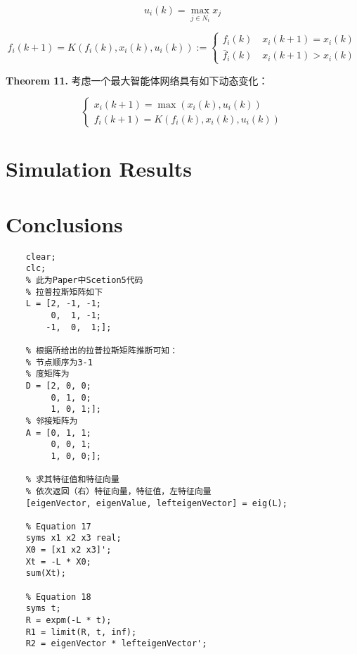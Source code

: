 \documentclass{article}
\begin{document}
\begin{equation}
    \tag{A4}
    \label{A4}
    u_i(k) = \max_{j\in N_i}x_j
\end{equation}

\begin{equation}
    \tag{43}
    \label{43}
    f_i(k+1) = K(f_i(k),x_i(k),u_i(k)):=
    \left\{
        \begin{matrix}
            f_i(k)\quad x_i(k+1)=x_i(k)\\
            \bar{f}_i(k) \quad x_i(k+1)>x_i(k)
        \end{matrix}
    \right.
\end{equation}

\noindent\textbf{Theorem 11.} 考虑一个最大智能体网络具有如下动态变化：

\begin{equation}
    \tag{44}
    \label{44}
    \left\{
        \begin{matrix}
            x_i(k+1) = \max(x_i(k),u_i(k))\\
            f_i(k+1) = K(f_i(k),x_i(k),u_i(k))
        \end{matrix}
    \right.
\end{equation}


\section{Simulation Results}

\section{Conclusions}


\begin{lstlisting}
    clear;
    clc;
    % 此为Paper中Scetion5代码
    % 拉普拉斯矩阵如下
    L = [2, -1, -1;
         0,  1, -1;
        -1,  0,  1;];
    
    % 根据所给出的拉普拉斯矩阵推断可知：
    % 节点顺序为3-1
    % 度矩阵为
    D = [2, 0, 0;
         0, 1, 0;
         1, 0, 1;];
    % 邻接矩阵为
    A = [0, 1, 1;
         0, 0, 1;
         1, 0, 0;];
     
    % 求其特征值和特征向量
    % 依次返回（右）特征向量，特征值，左特征向量
    [eigenVector, eigenValue, lefteigenVector] = eig(L);
    
    % Equation 17
    syms x1 x2 x3 real;
    X0 = [x1 x2 x3]';
    Xt = -L * X0;
    sum(Xt);
    
    % Equation 18
    syms t;
    R = expm(-L * t);
    R1 = limit(R, t, inf);
    R2 = eigenVector * lefteigenVector'; 
\end{lstlisting}
\end{document}
